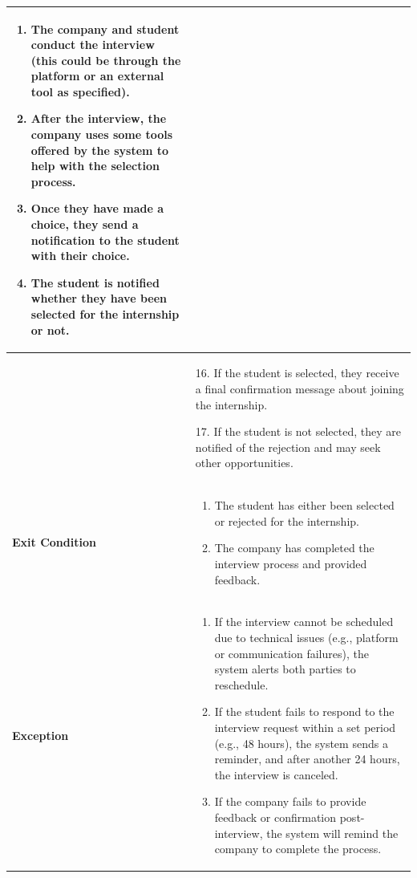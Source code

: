 \begin{longtable}{|p{}|p{}|}
\begin{enumerate}
    \item The company and student conduct the interview (this could be through the platform or an external tool as specified).
    \item After the interview, the company uses some tools offered by the system to help with the selection process.
    \item Once they have made a choice, they send a notification to the student with their choice.
    \item The student is notified whether they have been selected for the internship or not.
\end{enumerate} \\
\hline
  &  
    16. If the student is selected, they receive a final confirmation message about joining the internship.
    
    17. If the student is not selected, they are notified of the rejection and may seek other opportunities.
\\
\hline
\textbf{Exit Condition} &  
\begin{enumerate}
    \item The student has either been selected or rejected for the internship.
    \item The company has completed the interview process and provided feedback.
\end{enumerate}\\
\hline
\textbf{Exception} &  
\begin{enumerate}
    \item If the interview cannot be scheduled due to technical issues (e.g., platform or communication failures), the system alerts both parties to reschedule.
    \item If the student fails to respond to the interview request within a set period (e.g., 48 hours), the system sends a reminder, and after another 24 hours, the interview is canceled.
    \item If the company fails to provide feedback or confirmation post-interview, the system will remind the company to complete the process.
\end{enumerate} \\
\hline
\end{longtable}

